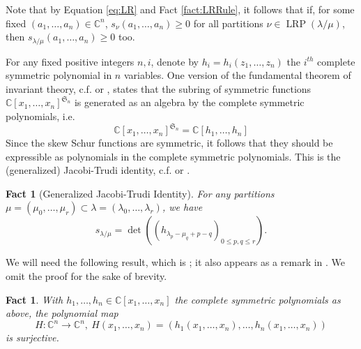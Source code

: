 \documentclass[unnumsec,webpdf,modern,medium]{oup-authoring-template}
\newcommand{\C}{\mathbb{C}}
\theoremstyle{theorem}
\newtheorem{fact}[theorem]{Fact}
\theoremstyle{definition}
\begin{document}
Note that by Equation \ref{eq:LR} and Fact \ref{fact:LRRule}, it follows that if, for some fixed $(a_1,\ldots,a_n)\in\C^n$, $s_\nu(a_1,\ldots,a_n)\geq 0$ for all partitions $\nu\in \operatorname{LRP}(\lambda/\mu)$, then $s_{\lambda/\mu}(a_1,\ldots,a_n)\geq 0$ too.

For any fixed positive integers $n,i$, denote by $h_i=h_i(z_1,\ldots,z_n)$ the $i^{th}$ complete symmetric polynomial in $n$ variables.  One version of the fundamental theorem of invariant theory, c.f. \cite[Proposition 1, page 73]{F} or \cite[Corollary 7.6.2]{Stanley}, states that the subring of symmetric functions $\C[x_1,\ldots,x_n]^{\mathfrak{S}_n}$ is generated as an algebra by the complete symmetric polynomials, i.e.
$$\C[x_1,\ldots,x_n]^{\mathfrak{S}_n}=\C[h_1,\ldots,h_n]$$ 
Since the skew Schur functions are symmetric, it follows that they should be expressible as polynomials in the complete symmetric polynomials.  This is the (generalized) Jacobi-Trudi identity, c.f. \cite[Exercise 7, page 77]{F} or \cite[Theorem 7.16.1]{Stanley}.
\begin{fact}[Generalized Jacobi-Trudi Identity]
	\label{fact:GJT}
	For any partitions $\mu=\left(\mu_0,\ldots,\mu_r\right)\subset\lambda=\left(\lambda_0,\ldots,\lambda_r\right)$, we have 
	$$s_{\lambda/\mu}=\det\left(\left(h_{\lambda_p-\mu_q+p-q}\right)_{0\leq p,q\leq r}\right).$$
\end{fact}



We will need the following result, which is \cite[Theorem 3.15]{LT}; it also appears as a remark in \cite[page 122]{Smith}.  We omit the proof for the sake of brevity.
\begin{fact}
	\label{lem:HSurj}
	With $h_1,\ldots,h_n\in\C[x_1,\ldots,x_n]$ the complete symmetric polynomials as above, the polynomial map 
	\begin{equation}
		\label{eq:Surj}
		H\colon \C^n\rightarrow\C^n, \ H(x_1,\ldots,x_n)=\left(h_1(x_1,\ldots,x_n),\ldots,h_n(x_1,\ldots,x_n)\right)
	\end{equation}
	is surjective.
\end{fact}
\end{document}
